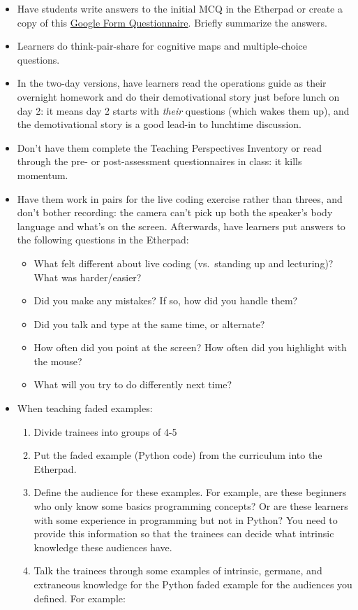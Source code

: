 \begin{itemize}
\item
  Have students write answers to the initial MCQ in the Etherpad or
  create a copy of this
  \href{http://goo.gl/forms/EHXfBSDmvqBLLVzj1}{Google Form
  Questionnaire}. Briefly summarize the answers.
\item
  Learners do think-pair-share for cognitive maps and multiple-choice
  questions.
\item
  In the two-day versions, have learners read the operations guide as
  their overnight homework and do their demotivational story just before
  lunch on day 2: it means day 2 starts with \emph{their} questions
  (which wakes them up), and the demotivational story is a good lead-in
  to lunchtime discussion.
\item
  Don't have them complete the Teaching Perspectives Inventory or read
  through the pre- or post-assessment questionnaires in class: it kills
  momentum.
\item
  Have them work in pairs for the live coding exercise rather than
  threes, and don't bother recording: the camera can't pick up both the
  speaker's body language and what's on the screen. Afterwards, have
  learners put answers to the following questions in the Etherpad:

  \begin{itemize}
    \item
    What felt different about live coding (vs.~standing up and
    lecturing)? What was harder/easier?
  \item
    Did you make any mistakes? If so, how did you handle them?
  \item
    Did you talk and type at the same time, or alternate?
  \item
    How often did you point at the screen? How often did you highlight
    with the mouse?
  \item
    What will you try to do differently next time?
  \end{itemize}
\item
  When teaching faded examples:

  \begin{enumerate}
      \item
    Divide trainees into groups of 4-5
  \item
    Put the faded example (Python code) from the curriculum into the
    Etherpad.
  \item
    Define the audience for these examples. For example, are these
    beginners who only know some basics programming concepts? Or are
    these learners with some experience in programming but not in
    Python? You need to provide this information so that the trainees
    can decide what intrinsic knowledge these audiences have.
  \item
    Talk the trainees through some examples of intrinsic, germane, and
    extraneous knowledge for the Python faded example for the audiences
    you defined. For example:


\end{enumerate}
\end{itemize}
